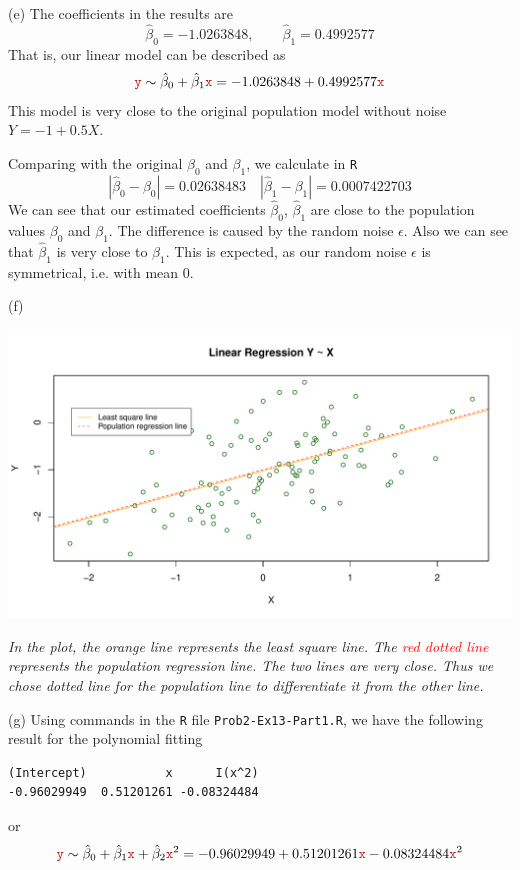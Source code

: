 \documentclass[a4paper,12pt]{article}
\newcommand{\code}[1]{\texttt{#1}}
\begin{document}
(e)
The coefficients in the results are
\[
    \hat\beta_0 = -1.0263848,\qquad 
    \hat\beta_1 = 0.4992577
\]
That is, our linear model can be described as 
\[
    \yr \sim \hat\beta_0 + \hat\beta_1\xr 
    = -1.0263848 + 0.4992577\xr
\]
This model is very close to the original population model without noise $Y = -1 + 0.5X$.

Comparing with the original $\beta_0$ and $\beta_1$, we calculate in \code{R}
\[
    |\hat\beta_0 - \beta_0| = 0.02638483 \quad 
    |\hat\beta_1 - \beta_1| = 0.0007422703
\]
We can see that our estimated coefficients $\hat\beta_0$, $\hat\beta_1$ are close to the population values $\beta_0$ and $\beta_1$. The difference is caused by the random noise $\epsilon$. 
Also we can see that $\hat\beta_1$ is very close to $\beta_1$. This is expected, as our random noise $\epsilon$ is symmetrical, i.e. with mean 0.
\bigskip




(f)
\begin{center}
    \includegraphics[width=0.9\linewidth]{Images/Prob2-Ex13-i-f.pdf}
    
    \parbox{0.65\textwidth}{\textit{In the plot, the \textcolor{myorange}{orange line} represents the least square line. The \textcolor{red}{red dotted line} represents the population regression line. The two lines are very close. Thus we chose dotted line for the population line to differentiate it from the other line.
    }}
\end{center}
\bigskip




(g)
Using commands in the \code{R} file \code{Prob2-Ex13-Part1.R}, we have the following result for the polynomial fitting 
\begin{verbatim}
(Intercept)           x      I(x^2) 
-0.96029949  0.51201261 -0.08324484
\end{verbatim}
or 
\[
    \yr \sim \hat{\beta}_0 + \hat{\beta}_1\xr + \hat{\beta}_2 \xr^2
    =
    -0.96029949
    + 0.51201261 \xr 
    -0.08324484 \xr^2 
\]
\end{document}
